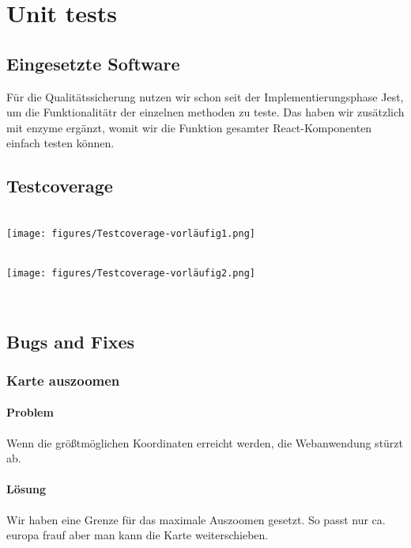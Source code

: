 \section{Unit tests}

\subsection{Eingesetzte Software}

Für die Qualitätssicherung nutzen wir schon seit der Implementierungsphase Jest, um die Funktionalitätr der einzelnen methoden zu teste. Das haben wir zusätzlich mit enzyme ergänzt, womit wir die Funktion gesamter React-Komponenten einfach testen können.

\subsection{Testcoverage}
\\
\texttt{[image: figures/Testcoverage-vorläufig1.png]}\par\vspace{1cm}
\\
\texttt{[image: figures/Testcoverage-vorläufig2.png]}\par\vspace{1cm}
\\

\subsection{Bugs and Fixes}

\subsubsection{Karte auszoomen}
\paragraph{Problem}
Wenn die größtmöglichen Koordinaten erreicht werden, die Webanwendung stürzt ab.

\paragraph{Lösung}
Wir haben eine Grenze für das maximale Auszoomen gesetzt. So passt nur ca. europa frauf aber man kann die Karte weiterschieben.


